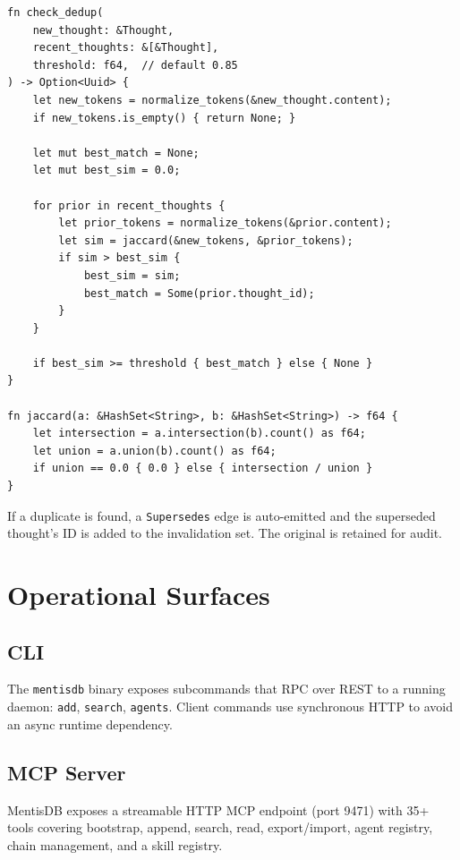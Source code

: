\documentclass[11pt,a4paper]{article}
\begin{document}
\begin{lstlisting}
fn check_dedup(
    new_thought: &Thought,
    recent_thoughts: &[&Thought],
    threshold: f64,  // default 0.85
) -> Option<Uuid> {
    let new_tokens = normalize_tokens(&new_thought.content);
    if new_tokens.is_empty() { return None; }

    let mut best_match = None;
    let mut best_sim = 0.0;

    for prior in recent_thoughts {
        let prior_tokens = normalize_tokens(&prior.content);
        let sim = jaccard(&new_tokens, &prior_tokens);
        if sim > best_sim {
            best_sim = sim;
            best_match = Some(prior.thought_id);
        }
    }

    if best_sim >= threshold { best_match } else { None }
}

fn jaccard(a: &HashSet<String>, b: &HashSet<String>) -> f64 {
    let intersection = a.intersection(b).count() as f64;
    let union = a.union(b).count() as f64;
    if union == 0.0 { 0.0 } else { intersection / union }
}
\end{lstlisting}

If a duplicate is found, a \texttt{Supersedes} edge is auto-emitted and the superseded
thought's ID is added to the invalidation set. The original is retained for audit.

\section{Operational Surfaces}

\subsection{CLI}

The \texttt{mentisdb} binary exposes subcommands that RPC over REST to a running daemon:
\texttt{add}, \texttt{search}, \texttt{agents}. Client commands use synchronous HTTP to
avoid an async runtime dependency.

\subsection{MCP Server}

MentisDB exposes a streamable HTTP MCP endpoint (port 9471) with 35+ tools covering
bootstrap, append, search, read, export/import, agent registry, chain management, and a
skill registry.
\end{document}
